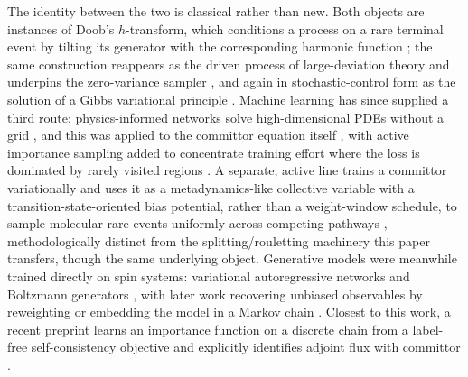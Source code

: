 \documentclass[a4paper,fleqn]{cas-sc}
\begin{document}
The identity between the two is classical rather than new. Both objects are instances of
Doob's $h$-transform, which conditions a process on a rare terminal event by tilting its
generator with the corresponding harmonic function \cite{doob1984}; the same construction
reappears as the driven process of large-deviation theory and underpins the zero-variance
sampler \cite{chetrite2015, touchette2009}, and again in stochastic-control form as the
solution of a Gibbs variational principle \cite{hartmann2019}. Machine learning has since
supplied a third route: physics-informed networks solve high-dimensional PDEs without a
grid \cite{raissi2019}, and this was applied to the committor equation itself
\cite{li2019, khoo2019}, with active importance sampling added to concentrate training
effort where the loss is dominated by rarely visited regions \cite{rotskoff2020}. A
separate, active line trains a committor variationally and uses it as a metadynamics-like
collective variable with a transition-state-oriented bias potential, rather than a
weight-window schedule, to sample molecular rare events uniformly across competing
pathways \cite{trizio2025}, methodologically distinct from the splitting/rouletting
machinery this paper transfers, though the same underlying object.
Generative models were meanwhile trained directly on spin systems: variational
autoregressive networks \cite{wu2019} and Boltzmann generators \cite{noe2019}, with
later work recovering unbiased observables by reweighting \cite{nicoli2020} or embedding
the model in a Markov chain \cite{gabrie2022}. Closest to this work, a recent preprint
learns an importance function on a discrete chain from a label-free self-consistency
objective and explicitly identifies adjoint flux with committor \cite{kim2026}.
\end{document}
